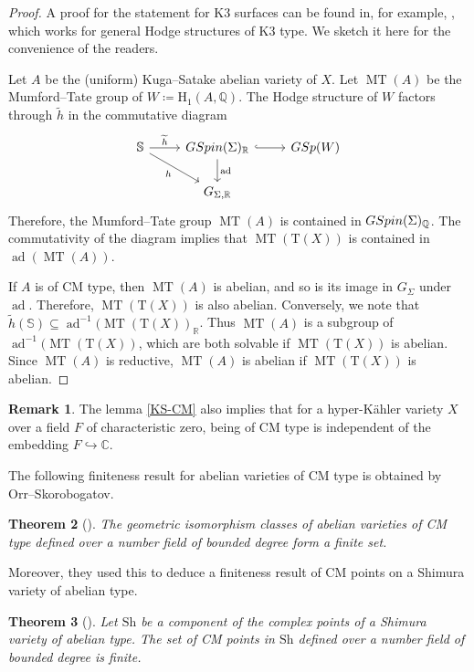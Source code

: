 \documentclass[11pt,reqno,oneside]{amsart}
\numberwithin{equation}{section}
\newtheorem{theorem}{Theorem}[section]
\theoremstyle{definition}
\newtheorem{remark}[theorem]{Remark}
\DeclareMathOperator{\ad}{ad}
\DeclareMathOperator{\MT}{MT}
\newcommand{\GSpin}{{\rm GSpin}}
\newcommand{\GSp}{{\rm GSp}}
\newcommand{\Sh}{\mathrm{Sh}}
\newcommand\rH{\mathrm{H}}
\newcommand{\rT}{\mathrm{T}}
\newcommand{\CC}{\mathbb{C}}
\newcommand{\QQ}{\mathbb{Q}}
\begin{document}
\begin{proof}
A proof for the statement for K3 surfaces can be found in, for example, \cite[Proposition 9.3]{CMlifting}, which works for general Hodge structures of K3 type. We sketch it here for the convenience of the readers. 

Let $A$ be the (uniform) Kuga--Satake abelian variety of $X$. Let $\MT(A)$ be the Mumford--Tate group of $W \coloneqq \rH_1(A, \QQ)$. The Hodge structure of $W$ factors through $\widetilde{h}$ in the commutative diagram
\[
\begin{tikzcd}
 \mathbb{S} \ar[r,"\widetilde{h}"] \ar[rd,"h"']&  \GSpin(\Sigma)_{\mathbb{R}} \ar[d,"\ad"] \ar[r,hook] & \GSp(W) \\
 & G_{\Sigma,\mathbb{R}} &
\end{tikzcd}
\]
Therefore, the Mumford--Tate group $\MT(A)$ is contained in $\GSpin(\Sigma)_\QQ$. The commutativity of the diagram implies that $\MT(\rT(X))$ is contained in $\ad(\MT(A))$.

If $A$ is of CM type, then $\MT(A)$ is abelian, and so is its image in $G_{\Sigma}$ under $\ad$. Therefore, $\MT(\rT(X))$ is also abelian. Conversely, we note that $\widetilde{h}(\mathbb{S}) \subseteq \ad^{-1}(\MT(\rT(X))_{\mathbb{R}}$. Thus $\MT(A)$ is a subgroup of $\ad^{-1}(\MT(\rT(X))$, which are both solvable if $\MT(\rT(X))$ is abelian. Since $\MT(A)$ is reductive, $\MT(A)$ is abelian if $\MT(\rT(X))$ is abelian.
\end{proof}
\begin{remark}
The lemma \ref{KS-CM} also implies that for a hyper-Kähler variety $X$ over a field $F$ of characteristic zero, being of CM type is independent of the embedding $F\hookrightarrow \CC$.

\end{remark}
The following finiteness result for abelian varieties of CM type is obtained by Orr--Skorobogatov.  
\begin{theorem}[{\cite[Theorem 2.5]{OrrSkorobogatov}}]\label{CMab-fin}
The geometric isomorphism classes of abelian varieties of CM type defined over a number field of bounded degree form a finite set. 
\end{theorem}
Moreover, they used this to deduce a finiteness result of CM points on a Shimura variety of abelian type.
\begin{theorem}[{\cite[Proposition 3.1]{OrrSkorobogatov}}]\label{CM-abfin}
Let $\Sh$ be a component of the complex points of a Shimura variety of abelian type. The set of CM points in $\Sh$ defined over a number field of bounded degree is finite.
\end{theorem}
\end{document}
